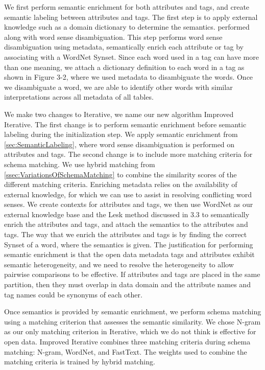 We first perform semantic enrichment for both attributes and tags, and create semantic labeling between attributes and tags.
The first step is to apply external knowledge such as a domain dictionary to determine the semantics.
performed along with word sense disambiguation.
This step performs word sense disambiguation using metadata, semantically enrich each attribute or tag by associating with a WordNet Synset.
Since each word used in a tag can have more than one meaning, we attach a dictionary definition to each word in a tag as shown in Figure 3-2, where we used metadata to disambiguate the words.
Once we disambiguate a word, we are able to identify other words with similar interpretations across all metadata of all tables.

We make two changes to Iterative, we name our new algorithm Improved Iterative. The first change is to perform semantic enrichment before semantic labeling during the initialization step. We apply semantic enrichment from \autoref{sec:SemanticLabeling}, where word sense disambiguation is performed on attributes and tags. The second change is to include more matching criteria for schema matching. We use hybrid matching from \autoref{ssec:VariationsOfSchemaMatching} to combine the similarity scores of the different matching criteria.
Enriching metadata relies on the availability of external knowledge, for which we can use to assist in resolving conflicting word senses. We create contexts for attributes and tags, we then use WordNet as our external knowledge base and the Lesk method discussed in 3.3 to semantically enrich the attributes and tags, and attach the semantics to the attributes and tags. The way that we enrich the attributes and tags is by finding the correct Synset of a word, where the semantics is given. The justification for performing semantic enrichment is that the open data metadata tags and attributes exhibit semantic heterogeneity, and we need to resolve the heterogeneity to allow pairwise comparisons to be effective. If attributes and tags are placed in the same partition, then they must overlap in data domain and the attribute names and tag names could be synonyms of each other.

Once semantics is provided by semantic enrichment, we perform schema matching using a matching criterion that assesses the semantic similarity. We chose N-gram as our only matching criterion in Iterative, which we do not think is effective for open data. Improved Iterative combines three matching criteria during schema matching: N-gram, WordNet, and FastText. The weights used to combine the matching criteria is trained by hybrid matching.

